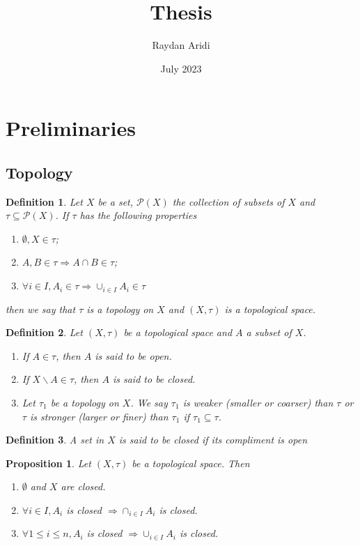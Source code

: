 \documentclass{article}
\title{Thesis}
\author{Raydan Aridi}
\date{July 2023}
\newtheorem{definition}{Definition}[subsection]
\newtheorem{proposition}{Proposition}[subsection]
\theoremstyle{definition}
\begin{document}
\maketitle
\section{Preliminaries}
\subsection{Topology}
\begin{definition}
    Let $X$ be a set, $\mathcal{P}(X)$ the collection of subsets of $X$ and $\tau \subseteq \mathcal{P}(X)$. If $\tau$ has the following properties
\begin{enumerate}
    \item $\emptyset, X \in \tau$;
    \item $A, B \in \tau \Longrightarrow A \cap B \in \tau$;
    \item $\forall i \in I, A_{i} \in \tau \Longrightarrow \cup_{i \in I} A_{i} \in \tau$

\end{enumerate}


then we say that $\tau$ is a topology on $X$ and $(X, \tau)$ is a topological space.

\end{definition}
\begin{definition}
    Let $(X, \tau)$ be a topological space and $A$ a subset of $X$.

\begin{enumerate}
    \item If $A \in \tau$, then $A$ is said to be open.
    \item If $X \backslash A \in \tau$, then $A$ is said to be closed.
    \item Let $\tau_{1}$ be a topology on $X$. We say $\tau_{1}$ is weaker (smaller or coarser) than $\tau$ or $\tau$ is stronger (larger or finer) than $\tau_{1}$ if $\tau_{1} \subseteq \tau$.
\end{enumerate}
\end{definition}
\begin{definition}
    A set in $X$ is said to be closed if its compliment is open
\end{definition}
\begin{proposition}
    Let $(X, \tau)$ be a topological space. Then
\begin{enumerate}
    \item $\emptyset$ and $X$ are closed.
    \item $\forall i \in I, A_{i}$ is closed $\Longrightarrow \cap_{i \in I} A_{i}$ is closed.
    \item $\forall 1 \leq i \leq n, A_{i}$ is closed $\Longrightarrow \cup_{i \in I} A_{i}$ is closed.
\end{enumerate}
\end{proposition}
\end{document}

